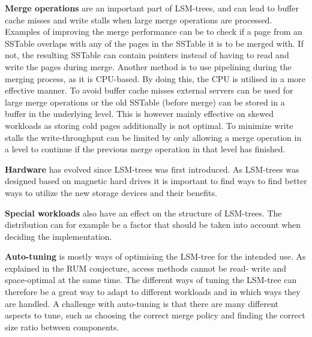 \noindent
\textbf{Merge operations} are an important part of LSM-trees, and can lead to buffer cache misses and write stalls when large merge operations are processed. Examples of improving the merge performance can be to check if a page from an SSTable overlaps with any of the pages in the SSTable it is to be merged with. If not, the resulting SSTable can contain pointers instead of having to read and write the pages during merge\cite{VTTree}. Another method is to use pipelining during the merging process, as it is CPU-based. By doing this, the CPU is utilised in a more effective manner\cite{ZhangEtAl}. To avoid buffer cache misses external servers\cite{AhmadEtAl} can be used for large merge operations or the old SSTable (before merge) can be stored in a buffer in the underlying level\cite{LSbMTree1}\cite{LSbMTree2}. This is however mainly effective on skewed workloads as storing cold pages additionally is not optimal. To minimize write stalls the write-throughput can be limited by only allowing a merge operation in a level to continue if the previous merge operation in that level has finished\cite{bLSM}. \newline

\noindent
\textbf{Hardware} has evolved since LSM-trees was first introduced. As LSM-trees was designed based on magnetic hard drives it is important to find ways to find better ways to utilize the new storage devices and their benefits. \newline

\noindent
\textbf{Special workloads} also have an effect on the structure of LSM-trees. The distribution can for example be a factor that should be taken into account when deciding the implementation. \newline

\noindent
\textbf{Auto-tuning} is mostly ways of optimising the LSM-tree for the intended use. As explained in the RUM conjecture\cite{RUM}, access methods cannot be read- write and space-optimal at the same time. The different ways of tuning the LSM-tree can therefore be a great way to adapt to different workloads and in which ways they are handled. A challenge with auto-tuning is that there are many different aspects to tune, such as choosing the correct merge policy and finding the correct size ratio between components.
